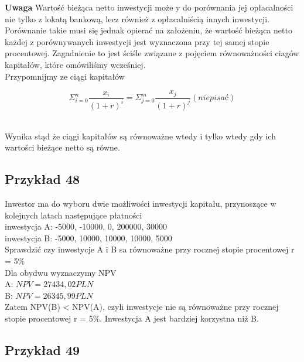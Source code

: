 \documentclass{article}
\begin{document}
\textbf{Uwaga} Wartość bieżąca netto inwestycji może y do porównania jej opłacalności nie tylko z lokatą bankową, lecz również z opłacalniścią innych inwestycji. Porównanie takie musi się jednak opierać na założeniu, że wartość bieżąca netto każdej z porównywanych inwestycji jest wyznaczona przy tej samej stopie procentowej. Zagadnienie to jest ściśle związane z pojęciem równoważności ciagów kapitałów, które omówiliśmy wcześniej.\\

Przypomnijmy ze ciągi kapitałów 

\begin{center}
	\begin{equation}
		\Sigma ^n_{i=0}\frac{x_i}{(1 + r)^i} = \Sigma ^m_{j=0}\frac{x_j}{(1 + r)^j} (nie pisać)
	\end{equation}
\end{center}\\

Wynika stąd że ciągi kapitałów są równoważne wtedy i tylko wtedy gdy ich wartości bieżące netto są równe.

\subsection{Przykład 48}
Inwestor ma do wyboru dwie możliwości inwestycji kapitału, przynoszące w kolejnych latach następujące płatności\\

inwestycja A: -5000, -10000, 0, 200000, 30000\\

inwestycja B: -5000, 10000, 10000, 10000, 5000\\

Sprawdzić czy inwestycje A i B sa równoważne przy rocznej stopie procentowej r = 5\%\\

Dla obydwu wyznaczymy NPV\\

A: $ NPV = 27 434,02 PLN $\\

B: $ NPV = 26 345,99 PLN $\\

Zatem NPV(B) < NPV(A), czyli inwestycje nie są równoważne przy rocznej stopie procentowej r = 5\%. Inwestycja A jest bardziej korzystna niż B.

\subsection{Przykład 49}
\end{document}

